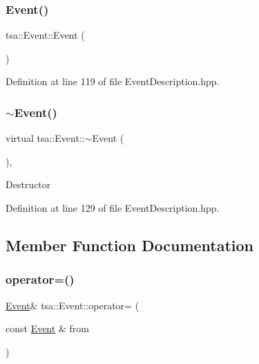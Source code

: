 \subsubsection{\texorpdfstring{Event()}{Event()}}
{\footnotesize\ttfamily tsa\+::\+Event\+::\+Event (\begin{DoxyParamCaption}{ }\end{DoxyParamCaption})\hspace{0.3cm}{\ttfamily [inline]}}



Definition at line 119 of file Event\+Description.\+hpp.

\mbox{\label{classtsa_1_1_event_ae01cd6ea28101fcbf3947de6b4176c3f}} 
\subsubsection{\texorpdfstring{$\sim$\+Event()}{~Event()}}
{\footnotesize\ttfamily virtual tsa\+::\+Event\+::$\sim$\+Event (\begin{DoxyParamCaption}{ }\end{DoxyParamCaption})\hspace{0.3cm}{\ttfamily [inline]}, {\ttfamily [virtual]}}

Destructor 

Definition at line 129 of file Event\+Description.\+hpp.



\subsection{Member Function Documentation}
\mbox{\label{classtsa_1_1_event_a8057303c7d7b0faea2594f86c03e0c97}} 
\subsubsection{\texorpdfstring{operator=()}{operator=()}}
{\footnotesize\ttfamily \hyperlink{classtsa_1_1_event}{Event}\& tsa\+::\+Event\+::operator= (\begin{DoxyParamCaption}\item[{const \hyperlink{classtsa_1_1_event}{Event} \&}]{from }\end{DoxyParamCaption})\hspace{0.3cm}{\ttfamily [inline]}}


